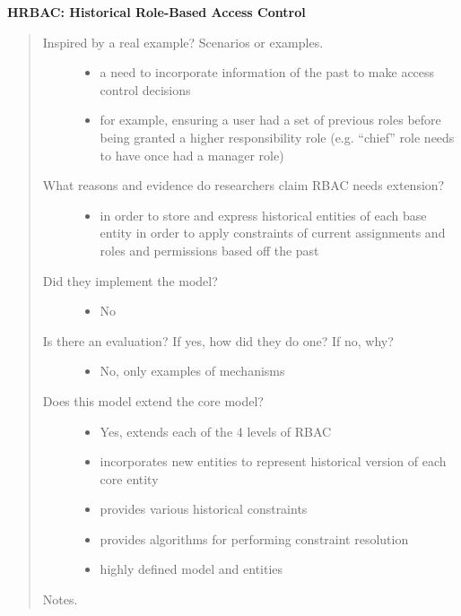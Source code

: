 \documentclass[letterpaper,10pt,english]{sphinxmanual}
\begin{document}
\textbf{HRBAC: Historical Role-Based Access Control}
\begin{quote}
\begin{description}
\item[{Inspired by a real example? Scenarios or examples.}] \leavevmode\begin{itemize}
\item {} 
a need to incorporate information of the past to make access control decisions

\item {} 
for example, ensuring a user had a set of previous roles before being granted a higher responsibility role (e.g. ``chief'' role needs to have once had a manager role)

\end{itemize}

\item[{What reasons and evidence do researchers claim RBAC needs extension?}] \leavevmode\begin{itemize}
\item {} 
in order to store and express historical entities of each base entity in order to apply constraints of current assignments and roles and permissions based off the past

\end{itemize}

\item[{Did they implement the model?}] \leavevmode\begin{itemize}
\item {} 
No

\end{itemize}

\item[{Is there an evaluation? If yes, how did they do one? If no, why?}] \leavevmode\begin{itemize}
\item {} 
No, only examples of mechanisms

\end{itemize}

\item[{Does this model extend the core model?}] \leavevmode\begin{itemize}
\item {} 
Yes, extends each of the 4 levels of RBAC

\item {} 
incorporates new entities to represent historical version of each core entity

\item {} 
provides various historical constraints

\item {} 
provides algorithms for performing constraint resolution

\item {} 
highly defined model and entities

\end{itemize}

\end{description}

Notes.
\end{quote}
\end{document}
